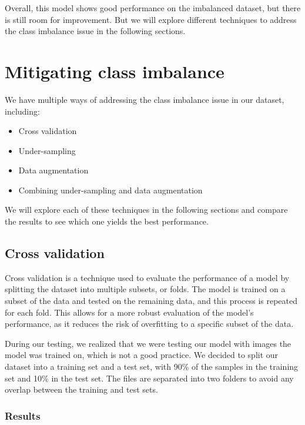 Overall, this model shows good performance on the imbalanced dataset, but there is still room for improvement. But we will explore different techniques
to address the class imbalance issue in the following sections.

\section{Mitigating class imbalance}
\label{sec:mitigating_class_imbalance}

We have multiple ways of addressing the class imbalance issue in our dataset, including:

\begin{itemize}
	\item Cross validation
	\item Under-sampling
	\item Data augmentation
	\item Combining under-sampling and data augmentation
\end{itemize}

We will explore each of these techniques in the following sections and compare the results to see which one yields the best performance.

\subsection{Cross validation}
\label{subsec:cross_validation}

Cross validation is a technique used to evaluate the performance of a model by splitting the dataset into multiple subsets, or folds.
The model is trained on a subset of the data and tested on the remaining data, and this process is repeated for each fold.
This allows for a more robust evaluation of the model's performance, as it reduces the risk of overfitting to a specific subset of the data.

\label{subsubsec:remaking_dataset}

During our testing, we realized that we were testing our model with images the model was trained on, which is not a good practice. We decided to
split our dataset into a training set and a test set, with 90\% of the samples in the training set and 10\% in the test set. The files are separated
into two folders to avoid any overlap between the training and test sets.

\subsubsection{Results}
\label{subsec:results_cross_validation}

